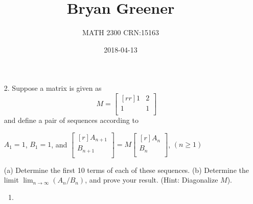 \documentclass[12pt]{article}
\title{Bryan Greener}
\author{MATH 2300 CRN:15163}
\date{2018-04-13}
\theoremstyle{definition}
\theoremstyle{plain}
\begin{document}
\maketitle

\TabPositions{4cm}

\begin{enumerate}
\item[2.]Suppose a matrix is given as
\[ M=\begin{bmatrix}[rr]1&2\\1&1\\\end{bmatrix} \]
and define a pair of sequences according to
\begin{center}
$A_1=1$, $B_1=1$, and $\begin{bmatrix}[r]A_{n+1}\\B_{n+1}\\\end{bmatrix}=M\begin{bmatrix}[r]A_n\\B_n\\\end{bmatrix}$, $(n\geq 1)$
\end{center}
(a) Determine the first 10 terms of each of these sequences. (b) Determine the limit $\lim_{n\rightarrow\infty}(A_n/B_n)$, and prove your result. (Hint: Diagonalize $M$).
\begin{enumerate}
\item

\end{enumerate}
\end{enumerate}
\end{document}
